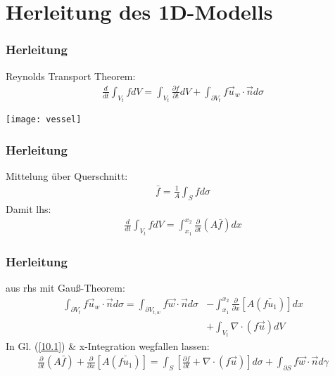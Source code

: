 \section{Herleitung des 1D-Modells}




\begin{frame}\frametitle{Herleitung}

  Reynolds Transport Theorem:
  \begin{align}
    \frac{d}{dt} \int_{V_t} f dV = \int_{V_t} \frac{\partial f}{\partial t}dV + \int_{\partial V_t} f \vec u_w \cdot \vec n d\sigma \label{10.1} %
  \end{align}

  \begin{center}
      \texttt{[image: vessel]}
  \end{center}

\end{frame}


\begin{frame}\frametitle{Herleitung}

  Mittelung über Querschnitt:
  \begin{align}
    \bar f = \frac{1}{A} \int_S f d\sigma %
  \end{align}
  Damit lhs:
  \begin{align}
    \frac{d}{dt} \int_{V_t} f dV = \int_{x_1}^{x_2} \frac{\partial}{\partial t} (A \bar f) dx %
  \end{align}

\end{frame}


\begin{frame}\frametitle{Herleitung}
  aus rhs mit Gauß-Theorem:
  \begin{equation}
  \begin{aligned}
    \int_{\partial V_t} f \vec u_w \cdot \vec n d\sigma = \int_{\partial V_{t, w}} f \vec w \cdot \vec n d\sigma &- \int_{x_1}^{x_2} \frac{\partial}{\partial x} \left[  A (\bar{f u_1}) \right] dx \\&+ \int_{V_t} \nabla \cdot (f \vec u) dV
  \end{aligned} %
\end{equation} %
In Gl. (\ref{10.1}) \& x-Integration wegfallen lassen:
\begin{align}
\boxed{
\frac{\partial}{\partial t} (A \bar f) + \frac{\partial}{\partial x} \left[ A (\bar{f u_1}) \right] = \int_S \left[ \frac{\partial f}{\partial t}
+ \nabla \cdot (f\vec u) \right] d \sigma
+ \int_{\partial S} f \vec w \cdot \vec n d \gamma} %
\end{align}
\end{frame}

